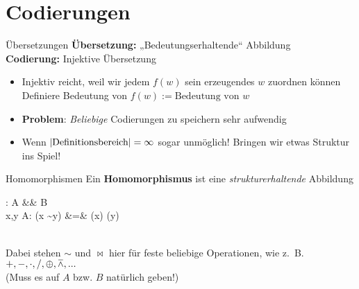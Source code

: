 \section{Codierungen}

\begin{frame}{Übersetzungen}
	\textbf{Übersetzung:} „Bedeutungserhaltende“ Abbildung \\[0.5em] \pause
	\textbf{Codierung:} Injektive Übersetzung \\ \pause
	\begin{itemize}
		\item Injektiv reicht, weil wir jedem $f(w)$ sein erzeugendes $w$ zuordnen können
		\implitem Definiere Bedeutung von $f(w) := \text{Bedeutung von } w$
	\end{itemize}
	
	\pause
	\begin{itemize}
		\item \textbf{Problem}: \emph{Beliebige} Codierungen zu speichern sehr aufwendig
		\item Wenn $\left\lvert \text{Definitionsbereich} \right\rvert = \infty$ \impl sogar unmöglich!
		\implitem Bringen wir etwas Struktur ins Spiel!
	\end{itemize}
\end{frame}

\begin{frame}{Homomorphismen}
	Ein \textbf{Homomorphismus} ist eine \textit{strukturerhaltende} Abbildung \\ \pause
	\begin{threealign}
		\Phi : A &\functionto& B \\
		 \forall x,y \in A: \quad  \Phi(x \sim y) &=& \Phi(x) \bowtie \Phi(y)
	\end{threealign}
	\medskip \\
	Dabei stehen $\sim$ und $\bowtie$ hier für feste beliebige Operationen, wie z.~B. $+, -, \cdot, /, \oplus, \barwedge, ...$ \\
	(Muss es auf $A$ bzw. $B$ natürlich geben!)
\end{frame}

